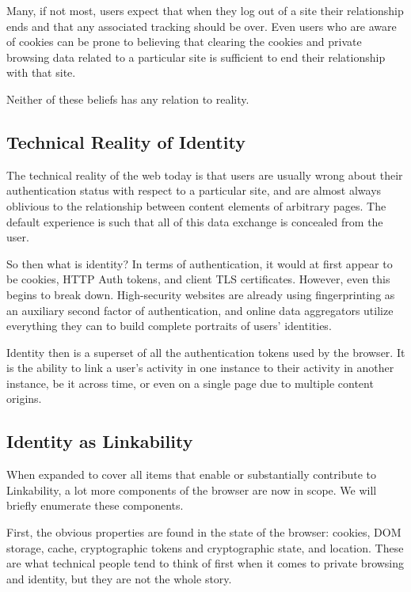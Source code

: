 \documentclass[letterpaper,11pt]{llncs}
\begin{document}
Many, if not most, users expect that when they log out of a site their
relationship ends and that any associated tracking should be over. Even
users who are aware of cookies can be prone to believing that clearing the
cookies and private browsing data related to a particular site is sufficient
to end their relationship with that site.

Neither of these beliefs has any relation to reality.

\subsection{Technical Reality of Identity}

The technical reality of the web today is that users are usually wrong about
their authentication status with respect to a particular site, and are almost
always oblivious to the relationship between content elements of arbitrary
pages. The default experience is such that all of this data exchange is
concealed from the user.

So then what is identity? In terms of authentication, it would at first appear
to be cookies, HTTP Auth tokens, and client TLS certificates. However, even this
begins to break down. High-security websites are already using fingerprinting
as an auxiliary second factor of authentication\cite{security-fingerprinting},
and online data aggregators utilize everything they can to build complete
portraits of users' identities\cite{tracking-identity}.

Identity then is a superset of all the authentication tokens used by the
browser. It is the ability to link a user's activity in one instance to their
activity in another instance, be it across time, or even on a single page
due to multiple content origins.

\subsection{Identity as Linkability}

When expanded to cover all items that enable or substantially contribute to
Linkability, a lot more components of the browser are now in scope. We will
briefly enumerate these components.

First, the obvious properties are found in the state of the browser: cookies,
DOM storage, cache, cryptographic tokens and cryptographic state, and
location. These are what technical people tend to think of first when it comes
to private browsing and identity, but they are not the whole story.
\end{document}
